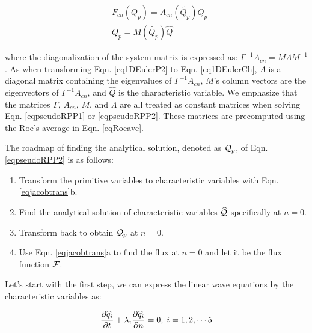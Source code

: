 \documentclass[12pt, letterpaper]{report}
\begin{document}
\begin{subequations}\label{eqjacobtrans}
   \begin{align}
   &F_{cn}(Q_p) = A_{cn}(\tilde{Q_p}) Q_p \\
   &Q_p = M(\tilde{Q_p}) \widehat{Q}
   \end{align}
\end{subequations}

where the diagonalization of the system matrix is expressed as: $\Gamma^{-1} A_{cn} = M \Lambda
M^{-1}$. As when transforming Eqn. \ref{eq1DEulerP2} to Eqn. \ref{eq1DEulerCh}, $\Lambda$ is a
diagonal matrix containing the eigenvalues of $\Gamma^{-1} A_{cn}$, $M$'s column vectors are the
eigenvectors of $\Gamma^{-1} A_{cn}$, and $\widehat{Q}$ is the characteristic variable. We emphasize
that the matrices $\Gamma$, $A_{cn}$, $M$, and $\Lambda$ are all treated as constant matrices when
solving Eqn.  \ref{eqpseudoRPP1} or \ref{eqpseudoRPP2}. These matrices are precomputed using the
Roe's average in Eqn. \ref{eqRoeave}. \paraspace

The roadmap of finding the analytical solution, denoted as $\mathcal{Q}_p$, of Eqn. \ref{eqpseudoRPP2} is as
follows:

\begin{enumerate}
   \item Transform the primitive variables to characteristic variables with Eqn. \ref{eqjacobtrans}b.
   \item Find the analytical solution of characteristic variables $\widehat{\mathcal{Q}}$ specifically at
      $n = 0$.
   \item Transform back to obtain $\mathcal{Q}_p$ at $n = 0$.
   \item Use Eqn. \ref{eqjacobtrans}a to find the flux at $n = 0$ and let it be the flux function
      $\mathcal{F}$.
\end{enumerate}                                               

Let's start with the first step, we can express the linear wave equations by the characteristic
variables as:

\begin{align}\label{eqChari}
   \frac{\partial \widehat{q}_i}{\partial t} + \lambda_i \frac{\partial \widehat{q}_i}{\partial n} = 0, \; i = 1, 2,
   \cdots 5
\end{align}
\end{document}
